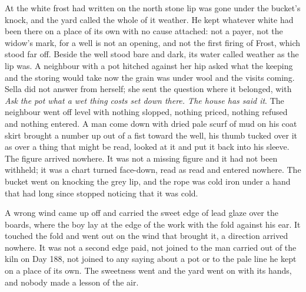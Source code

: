 At  the white frost had written on the north stone lip was gone under the bucket's knock, and the yard called the whole of it weather. He kept whatever white had been there on a place of its own with no cause attached: not a payer, not the widow's mark, for a well is not an opening, and not the first firing of Frost, which stood far off. Beside the well  stood bare and dark, its water called weather as the lip was. A neighbour with a pot hitched against her hip asked what the keeping and the storing would take now the grain was under wool and the visits coming. Sella did not answer from herself; she sent the question where it belonged, with \emph{Ask the pot what a wet thing costs set down there. The house has said it}. The neighbour went off level with nothing slopped, nothing priced, nothing refused and nothing entered. A man come down  with dried pale scurf of mud on his coat skirt brought a number up out of a fist toward the well, his thumb tucked over it as over a thing that might be read, looked at it and put it back into his sleeve. The figure arrived nowhere. It was not a missing figure and it had not been withheld; it was a chart turned face-down, read as read and entered nowhere. The bucket went on knocking the grey lip, and the rope was cold iron under a hand that had long since stopped noticing that it was cold.

A wrong wind came up off  and carried the sweet edge of lead glaze over the boards, where the boy lay at the edge of the work with the fold against his ear. It touched the fold and went out on the wind that brought it, a direction arrived nowhere. It was not a second edge paid, not joined to the man carried out of the kiln on Day 188, not joined to any saying about a pot or to the pale line he kept on a place of its own. The sweetness went and the yard went on with its hands, and nobody made a lesson of the air.

\scenebreak

